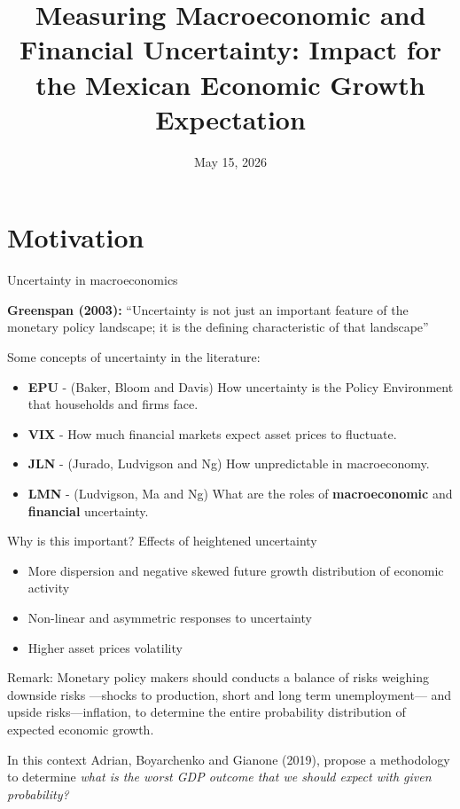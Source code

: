 \documentclass[handout,aspectratio=169,11pt,xcolor={dvipsnames},hyperref={pdftex,pdfpagemode=UseNone,hidelinks,pdfdisplaydoctitle=true},usepdftitle=false]{beamer}
\title{Measuring Macroeconomic and Financial Uncertainty: Impact for the Mexican Economic Growth Expectation}
\date{May 15, 2026}
\begin{document}

\begin{frame}
\titlepage
 \end{frame}

\section{Motivation}
\begin{frame}{Uncertainty in macroeconomics}


\textbf{Greenspan (2003):} ``Uncertainty is not just an important feature of the monetary policy landscape; it is the defining characteristic of that landscape''

\vspace{4mm}

Some concepts of uncertainty in the literature: 
\begin{itemize}

\item \textbf{EPU} - (Baker, Bloom and Davis) How uncertainty is the Policy Environment that households and firms face.
\item \textbf{VIX} - How much financial markets expect asset prices to fluctuate.
\item \textbf{JLN} - (Jurado, Ludvigson and Ng) How unpredictable in macroeconomy.
\item \textbf{LMN} - (Ludvigson, Ma and Ng) What are the roles of \textbf{macroeconomic} and \textbf{financial} uncertainty.
\end{itemize}



\end{frame}


\begin{frame}{Why is this important?}
Effects of heightened uncertainty
\begin{itemize}
\item More dispersion and negative skewed future growth distribution of economic activity
\item Non-linear and asymmetric responses to uncertainty
\item Higher asset prices volatility
\end{itemize}

Remark:
Monetary policy makers should conducts a balance of risks weighing downside risks ---shocks to production, short and long term unemployment--- and upside risks---inflation, to determine the entire probability distribution of expected economic growth. 


In this context Adrian, Boyarchenko and Gianone (2019), propose a methodology to determine \textit{what is the worst GDP outcome that we should expect with given probability?}

\end{frame}
\end{document}
